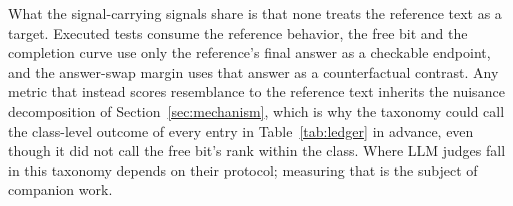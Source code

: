 What the signal-carrying signals share is that none treats the reference text as a target.
Executed tests consume the reference behavior, the free bit and the completion curve use only the reference's final answer as a checkable endpoint, and the answer-swap margin uses that answer as a counterfactual contrast.
Any metric that instead scores resemblance to the reference text inherits the nuisance decomposition of Section~\ref{sec:mechanism}, which is why the taxonomy could call the class-level outcome of every entry in Table~\ref{tab:ledger} in advance, even though it did not call the free bit's rank within the class.
Where LLM judges fall in this taxonomy depends on their protocol; measuring that is the subject of companion work.
